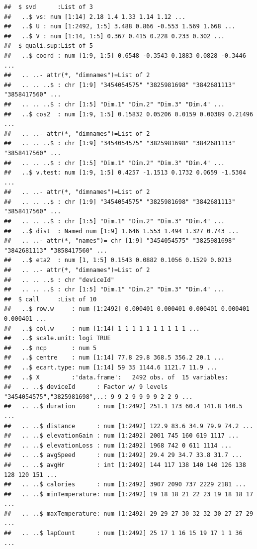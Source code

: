 \documentclass[
]{book}
\begin{document}
\begin{verbatim}
##  $ svd      :List of 3
##   ..$ vs: num [1:14] 2.18 1.4 1.33 1.14 1.12 ...
##   ..$ U : num [1:2492, 1:5] 3.488 0.866 -0.553 1.569 1.668 ...
##   ..$ V : num [1:14, 1:5] 0.367 0.415 0.228 0.233 0.302 ...
##  $ quali.sup:List of 5
##   ..$ coord : num [1:9, 1:5] 0.6548 -0.3543 0.1883 0.0828 -0.3446 ...
##   .. ..- attr(*, "dimnames")=List of 2
##   .. .. ..$ : chr [1:9] "3454054575" "3825981698" "3842681113" "3858417560" ...
##   .. .. ..$ : chr [1:5] "Dim.1" "Dim.2" "Dim.3" "Dim.4" ...
##   ..$ cos2  : num [1:9, 1:5] 0.15832 0.05206 0.0159 0.00389 0.21496 ...
##   .. ..- attr(*, "dimnames")=List of 2
##   .. .. ..$ : chr [1:9] "3454054575" "3825981698" "3842681113" "3858417560" ...
##   .. .. ..$ : chr [1:5] "Dim.1" "Dim.2" "Dim.3" "Dim.4" ...
##   ..$ v.test: num [1:9, 1:5] 0.4257 -1.1513 0.1732 0.0659 -1.5304 ...
##   .. ..- attr(*, "dimnames")=List of 2
##   .. .. ..$ : chr [1:9] "3454054575" "3825981698" "3842681113" "3858417560" ...
##   .. .. ..$ : chr [1:5] "Dim.1" "Dim.2" "Dim.3" "Dim.4" ...
##   ..$ dist  : Named num [1:9] 1.646 1.553 1.494 1.327 0.743 ...
##   .. ..- attr(*, "names")= chr [1:9] "3454054575" "3825981698" "3842681113" "3858417560" ...
##   ..$ eta2  : num [1, 1:5] 0.1543 0.0882 0.1056 0.1529 0.0213
##   .. ..- attr(*, "dimnames")=List of 2
##   .. .. ..$ : chr "deviceId"
##   .. .. ..$ : chr [1:5] "Dim.1" "Dim.2" "Dim.3" "Dim.4" ...
##  $ call     :List of 10
##   ..$ row.w     : num [1:2492] 0.000401 0.000401 0.000401 0.000401 0.000401 ...
##   ..$ col.w     : num [1:14] 1 1 1 1 1 1 1 1 1 1 ...
##   ..$ scale.unit: logi TRUE
##   ..$ ncp       : num 5
##   ..$ centre    : num [1:14] 77.8 29.8 368.5 356.2 20.1 ...
##   ..$ ecart.type: num [1:14] 59 35 1144.6 1121.7 11.9 ...
##   ..$ X         :'data.frame':	2492 obs. of  15 variables:
##   .. ..$ deviceId      : Factor w/ 9 levels "3454054575","3825981698",..: 9 9 2 9 9 9 9 2 2 9 ...
##   .. ..$ duration      : num [1:2492] 251.1 173 60.4 141.8 140.5 ...
##   .. ..$ distance      : num [1:2492] 122.9 83.6 34.9 79.9 74.2 ...
##   .. ..$ elevationGain : num [1:2492] 2001 745 160 619 1117 ...
##   .. ..$ elevationLoss : num [1:2492] 1968 742 0 611 1114 ...
##   .. ..$ avgSpeed      : num [1:2492] 29.4 29 34.7 33.8 31.7 ...
##   .. ..$ avgHr         : int [1:2492] 144 117 138 140 140 126 138 128 120 151 ...
##   .. ..$ calories      : num [1:2492] 3907 2090 737 2229 2181 ...
##   .. ..$ minTemperature: num [1:2492] 19 18 18 21 22 23 19 18 18 17 ...
##   .. ..$ maxTemperature: num [1:2492] 29 29 27 30 32 32 30 27 27 29 ...
##   .. ..$ lapCount      : num [1:2492] 25 17 1 16 15 19 17 1 1 36 ...

\end{verbatim}
\end{document}
